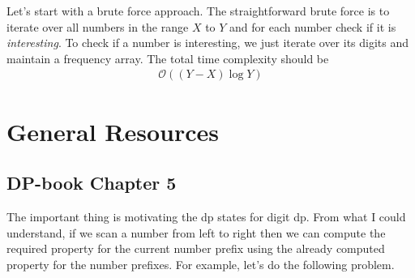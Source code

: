 \documentclass[11pt]{scrartcl}
\begin{document}
Let's start with a brute force approach. The straightforward brute force is to iterate over all numbers in the range $X$ to $Y$ and for each number check if it is \emph{interesting}. To check if a number is interesting, we just iterate over its digits and maintain a frequency array. The total time complexity should be 
\begin{align*}
    \mathcal{O} \left( (Y - X) \log Y\right)
\end{align*}














\newpage
\section{General Resources}
\subsection{DP-book Chapter 5}
The important thing is motivating the dp states for digit dp. From what I could understand, if we scan a number from left to right then we can compute the required property for the current number prefix using the already computed property for the number prefixes. For example, let's do the following problem.
\end{document}

